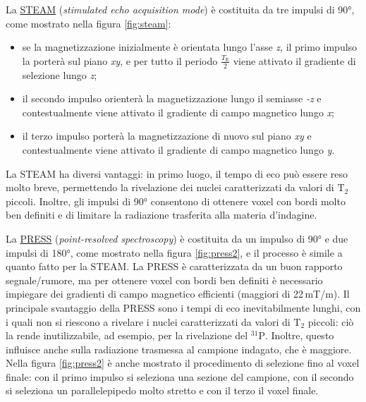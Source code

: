 \documentclass{report}
\newcommand{\figref}[1]{figura \ref{#1}}
\numberwithin{equation}{section}
\numberwithin{figure}{section}
\begin{document}
La \underline{STEAM} (\textit{stimulated echo acquisition mode}) è costituita da tre impulsi di 90°, come mostrato nella \figref{fig:steam}: 
\begin{itemize}[label=$-$]
    \item se la magnetizzazione inizialmente è orientata lungo l'asse \textit{z}, il primo impulso la porterà sul piano \textit{xy}, e per tutto il periodo $\frac{T_\mathrm{E}}{2}$ viene attivato il gradiente di selezione lungo \textit{z};
    \item il secondo impulso orienterà la magnetizzazione lungo il semiasse \textit{-z} e contestualmente viene attivato il gradiente di campo magnetico lungo \textit{x};
    \item il terzo impulso porterà la magnetizzazione di nuovo sul piano \textit{xy} e contestualmente viene attivato il gradiente di campo magnetico lungo \textit{y}.
\end{itemize}
La STEAM ha diversi vantaggi: in primo luogo, il tempo di eco può essere reso molto breve, permettendo la rivelazione dei nuclei caratterizzati da valori di $\mathrm{T_2}$ piccoli. Inoltre, gli impulsi di 90° consentono di ottenere voxel con bordi molto ben definiti e di limitare la radiazione trasferita alla materia d'indagine.

La \underline{PRESS} (\textit{point-resolved spectroscopy}) è costituita da un impulso di 90° e due impulsi di 180°, come mostrato nella \figref{fig:press2}, e il processo è simile a quanto fatto per la STEAM. La PRESS è caratterizzata da un buon rapporto segnale/rumore, ma per ottenere voxel con bordi ben definiti è necessario impiegare dei gradienti di campo magnetico efficienti (maggiori di 22\,mT/m). Il principale svantaggio della PRESS sono i tempi di eco inevitabilmente lunghi, con i quali non si riescono a rivelare i nuclei caratterizzati da valori di $\mathrm{T_2}$ piccoli: ciò la rende inutilizzabile, ad esempio, per la rivelazione del $\mathrm{^{31}P}$. Inoltre, questo influisce anche sulla radiazione trasmessa al campione indagato, che è maggiore. Nella \figref{fig:press2} è anche mostrato il procedimento di selezione fino al voxel finale: con il primo impulso si seleziona una sezione del campione, con il secondo si seleziona un parallelepipedo molto stretto e con il terzo il voxel finale.
\end{document}

